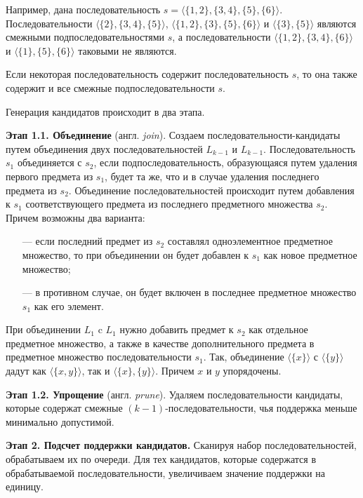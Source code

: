 Например, дана последовательность $s = \langle\{1,2\},\{3,4\},\{5\},\{6\}\rangle$. Последовательности $\langle\{2\},\{3,4\},\{5\}\rangle$, $\langle\{1,2\},\{3\},\{5\},\{6\}\rangle$ и $\langle\{3\},\{5\}\rangle$ являются смежными подпоследовательностями $s$, а последовательности $\langle\{1,2\},\{3,4\},\{6\}\rangle$ и $\langle\{1\},\{5\},\{6\}\rangle$ таковыми не являются.

Если некоторая последовательность содержит последовательность $s$, то она также содержит и все смежные подпоследовательности $s$.

Генерация кандидатов происходит в два этапа.

\textbf{Этап 1.1. Объединение} (англ. \textit{join}). Создаем последовательности-кандидаты путем объединения двух последовательностей $L_{k−1}$ и $L_{k−1}$. Последовательность $s_1$ объединяется с $s_2$, если подпоследовательность, образующаяся путем удаления первого предмета из $s_1$, будет та же, что и в случае удаления последнего предмета из $s_2$. Объединение последовательностей происходит путем добавления к $s_1$ соответствующего предмета из последнего предметного множества $s_2$. Причем возможны два варианта:
\begin{itemize}
	\item[---] если последний предмет из $s_2$ составлял одноэлементное предметное множество, то при объединении он будет добавлен к $s_1$ как новое предметное множество;
	\item[---] в противном случае, он будет включен в последнее предметное множество $s_1$ как его элемент.
\end{itemize}

При объединении $L_1$ c $L_1$ нужно добавить предмет к $s_2$ как отдельное предметное множество, а также в качестве дополнительного предмета в предметное множество последовательности $s_1$. Так, объединение $\langle\{x\}\rangle$ с $\langle\{y\}\rangle$ дадут как $\langle\{x, y\}\rangle$, так и $\langle\{x\},\{y\}\rangle$. Причем $x$ и $y$ упорядочены.

\textbf{Этап 1.2. Упрощение} (англ. \textit{prune}). Удаляем последовательности кандидаты, которые содержат смежные $(k-1)$-последовательности, чья поддержка меньше минимально допустимой.

\textbf{Этап 2. Подсчет поддержки кандидатов.} Сканируя набор последовательностей, обрабатываем их по очереди. Для тех кандидатов, которые содержатся в обрабатываемой последовательности, увеличиваем значение поддержки на единицу.	

